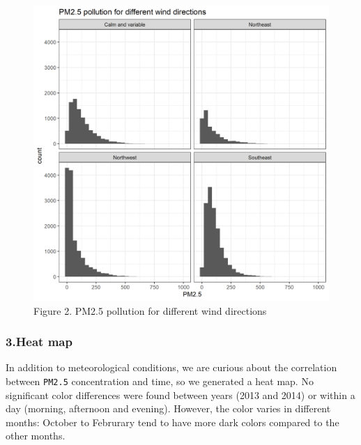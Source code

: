 \documentclass[]{article}
\begin{document}
\begin{figure}
\centering
\includegraphics{../images/facted_hist.png}
\caption{Figure 2. PM2.5 pollution for different wind directions}
\end{figure}

\hypertarget{heat-map}{%
\subsubsection{3.Heat map}\label{heat-map}}

In addition to meteorological conditions, we are curious about the
correlation between \texttt{PM2.5} concentration and time, so we
generated a heat map. No significant color differences were found
between years (2013 and 2014) or within a day (morning, afternoon and
evening). However, the color varies in different months: October to
Februrary tend to have more dark colors compared to the other months.
\end{document}
